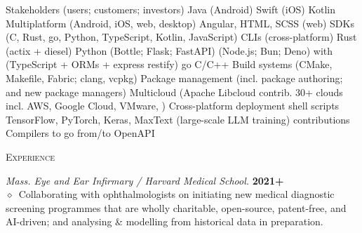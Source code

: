 \documentclass[11pt, a4paper]{article}
\newcommand{\dates}[1]{\hfill\mbox{\textbf{#1}}} %
\newcommand{\smaller}[1]{{\small$\diamond$\ #1}}
\newcommand{\headright}[1]{\vspace*{2.5ex}\textsc{\Large\color{cvblue}#1}\par%
     \vspace*{-2ex}{\color{cvblue}\hrulefill}\par}
\begin{document}
\begin{minipage}[t]{0.56\textwidth}
\begin{tcbitemize}[raster columns=1, outerbox, 
    raster row skip=2pt]
    \tcbitem[colback=mybluei!40] 
        \begin{tcbitemize}[raster columns=6, raster rows=5, 
            raster equal height=all, 
            raster row skip=1pt, 
            raster column skip=1pt, 
            title style={left color=yellow!50!blue,right color=blue!50!green!50!black},
            innerbox]
            \tcbitem[raster multicolumn=6, colframe=blue!50!green!50!black, colback=blue!50!green!50!black, height=1cm] Stakeholders (users; customers; investors)
            \tcbitem Java (\mbox{Android})
            \tcbitem Swift (iOS)
            \tcbitem Kotlin Multiplatform (Android, iOS, web, desktop)
            \tcbitem Angular, HTML, SCSS (web)
            \tcbitem SDKs (C, Rust, go, Python, TypeScript, Kotlin, JavaScript)
            \tcbitem CLIs (cross-platform)
            \tcbitem[colback=myorange] Rust (actix + diesel)
            \tcbitem[colback=myorange] Python (Bottle; Flask; FastAPI)
            \tcbitem[raster multicolumn=2, colback=myorange] (Node.js; Bun; Deno) with (TypeScript + ORMs + express \textbar{} restify)
            \tcbitem[colback=myorange] go
            \tcbitem[colback=myorange] C/C++
            \tcbitem[colback=purple]Build systems (CMake, Makefile, Fabric; clang, vcpkg)
            \tcbitem[raster multicolumn=2, colback=purple] Package management (incl. package authoring; and new package managers)
            \tcbitem[raster multicolumn=2, colback=purple] Multicloud (Apache Libcloud contrib. 30+ clouds incl. AWS, Google Cloud, VMware, \textellipsis{})
            \tcbitem[colback=purple] Cross-platform deployment shell scripts
            \tcbitem[raster multicolumn=3,colback=darkpink] TensorFlow, PyTorch, Keras, MaxText (large-scale LLM training) contributions
            \tcbitem[raster multicolumn=3, colback=mygreen!140] Compilers to go from/to OpenAPI
        \end{tcbitemize}
\end{tcbitemize}

\headright{Experience}

\textit{Mass. Eye and Ear Infirmary / Harvard Medical School.}  \dates{2021+} \\
\smaller{Collaborating with ophthalmologists on initiating new medical diagnostic screening programmes that are wholly charitable, open-source, patent-free, and AI-driven; and analysing \& modelling from historical data in preparation.}


\end{minipage}
\end{document}
